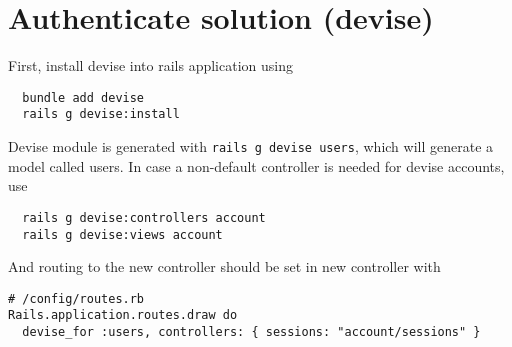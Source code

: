 \section{Authenticate solution (devise)}

First, install devise into rails application using
\begin{verbatim}
  bundle add devise
  rails g devise:install
\end{verbatim}

Devise module is generated with \texttt{rails g devise users}, which will generate a model called users.
In case a non-default controller is needed for devise accounts, use
\begin{verbatim}
  rails g devise:controllers account
  rails g devise:views account
\end{verbatim}

And routing to the new controller should be set in new controller with
\begin{verbatim}
# /config/routes.rb
Rails.application.routes.draw do
  devise_for :users, controllers: { sessions: "account/sessions" }
\end{verbatim}


\printbibliography
